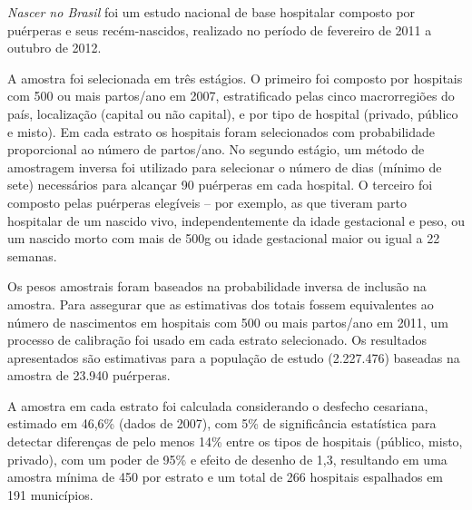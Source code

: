 \documentclass{article}
\begin{document}
\textit{Nascer no Brasil}
foi um estudo nacional de base hospitalar composto
por puérperas e seus recém-nascidos, realizado no período de fevereiro de 2011 a
outubro de 2012.

A amostra foi selecionada em três estágios. O primeiro foi composto por
hospitais
com 500 ou mais partos/ano em 2007, estratificado pelas cinco macrorregiões do
país, localização (capital ou não capital), e por tipo de hospital (privado,
público e misto). Em cada estrato os hospitais foram selecionados com
probabilidade proporcional ao número de partos/ano. No segundo estágio, um
método de amostragem inversa foi utilizado para selecionar o número de dias
(mínimo de sete) necessários para alcançar 90 puérperas em cada hospital. O
terceiro foi composto pelas puérperas elegíveis – por exemplo, as que tiveram
parto hospitalar de um nascido vivo, independentemente da idade gestacional e
peso, ou um nascido morto com mais de 500g ou idade gestacional maior ou igual a
22 semanas.

Os pesos amostrais foram baseados na probabilidade inversa de inclusão na
amostra. Para assegurar que as estimativas dos totais fossem equivalentes ao
número de nascimentos em hospitais com 500 ou mais partos/ano em 2011, um
processo de calibração foi usado em cada estrato selecionado. Os resultados
apresentados são estimativas para a população de estudo (2.227.476) baseadas na
amostra de 23.940 puérperas.

A amostra em cada estrato foi calculada considerando o desfecho cesariana,
estimado em 46,6\% (dados de 2007), com 5\% de significância estatística para
detectar diferenças de pelo menos 14\% entre os tipos de hospitais (público,
misto, privado), com um poder de 95\% e efeito de desenho de 1,3, resultando em
uma amostra mínima de 450 por estrato e um total de 266 hospitais espalhados em
191 municípios.
\end{document}
